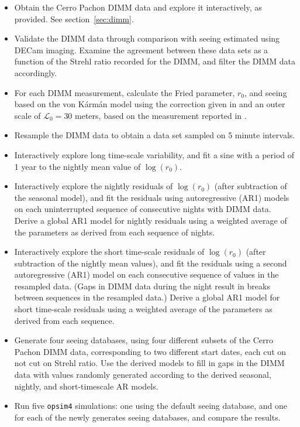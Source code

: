\documentclass[DM,authoryear,toc]{lsstdoc}
\begin{document}
\begin{itemize}

  \item Obtain the Cerro Pachon DIMM data and explore it
    interactively, as provided. See section~\ref{sec:dimm}.
  \item Validate the DIMM data through comparison with seeing
    estimated using DECam imaging. Examine the agreement between these
    data sets as a function of the Strehl ratio recorded for the DIMM,
    and filter the DIMM data accordingly.
  \item For each DIMM measurement, calculate the Fried parameter,
    $r_{0}$, and seeing based on the von K\'arm\'an model using the
    correction given in \cite{2002PASP..114.1156T} and an outer scale
    of $\mathcal{L}_{0} = 30$ meters, based on the measurement
    reported in \cite{2000ApOpt..39.5415Z}.
  \item Resample the DIMM data to obtain a data set sampled on 5
    minute intervals.
  \item Interactively explore long time-scale variability, and fit
    a sine with a period of 1 year to the nightly mean value of
    $\log(r_{0})$.
  \item Interactively explore the nightly residuals of $\log(r_{0})$
    (after subtraction of the seasonal model), and fit the residuals
    using autoregressive (AR1) models on each uninterrupted sequence
    of consecutive nights with DIMM data. Derive a global AR1 model
    for nightly residuals using a weighted average of the parameters
    as derived from each sequence of nights.
  \item Interactively explore the short time-scale residuals of
    $\log(r_{0})$ (after subtraction of the nightly mean values), and fit the
    residuals using a second autoregressive (AR1) model on each
    consecutive sequence of values in the resampled data. (Gaps
    in DIMM data during the night result in breaks between sequences
    in the resampled data.) Derive a global AR1 model for short
    time-scale residuals using a weighted average of the parameters as
    derived from each sequence.
  \item Generate four seeing databases, using four different subsets
    of the Cerro Pachon DIMM data, corresponding to two different
    start dates, each cut on not cut on Strehl ratio. Use the derived
    models to fill in gaps in the DIMM data with values randomly
    generated according to the derived seasonal, nightly, and
    short-timescale AR models.
  \item Run five \texttt{opsim4} simulations: one using the default seeing
    database, and one for each of the newly generates seeing
    databases, and compare the results.
\end{itemize}
\end{document}

